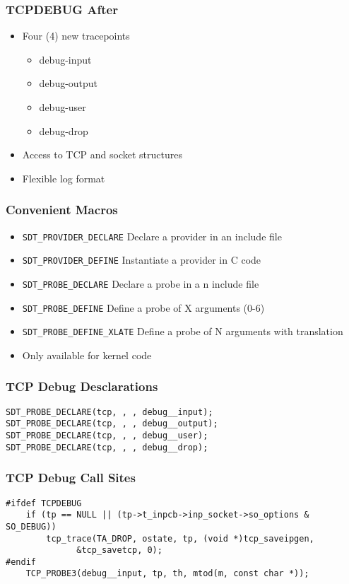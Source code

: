 \documentclass[pdftex]{beamer}
\begin{document}
\begin{frame}
  \frametitle{TCPDEBUG After}
  \begin{itemize}
  \item Four (4) new tracepoints
    \begin{itemize}
    \item debug-input
    \item debug-output
    \item debug-user
    \item debug-drop
    \end{itemize}
  \item Access to TCP and socket structures
  \item Flexible log format
  \end{itemize}
\end{frame}

\begin{frame}[fragile]
  \frametitle{Convenient Macros}
  \begin{itemize}
  \item \verb|SDT_PROVIDER_DECLARE| Declare a provider in an include file
  \item \verb|SDT_PROVIDER_DEFINE| Instantiate a provider in C code
  \item \verb|SDT_PROBE_DECLARE| Declare a probe in a n include file
  \item \verb|SDT_PROBE_DEFINE| Define a probe of X arguments (0-6)
  \item \verb|SDT_PROBE_DEFINE_XLATE| Define a probe of N arguments with translation
  \item Only available for kernel code
  \end{itemize}
\end{frame}

\begin{frame}[fragile]
  \frametitle{TCP Debug Desclarations}
\begin{lstlisting}
SDT_PROBE_DECLARE(tcp, , , debug__input);
SDT_PROBE_DECLARE(tcp, , , debug__output);
SDT_PROBE_DECLARE(tcp, , , debug__user);
SDT_PROBE_DECLARE(tcp, , , debug__drop);
\end{lstlisting}
\end{frame}

\begin{frame}[fragile]
  \frametitle{TCP Debug Call Sites}
\begin{lstlisting}
#ifdef TCPDEBUG
	if (tp == NULL || (tp->t_inpcb->inp_socket->so_options & SO_DEBUG))
		tcp_trace(TA_DROP, ostate, tp, (void *)tcp_saveipgen,
			  &tcp_savetcp, 0);
#endif
	TCP_PROBE3(debug__input, tp, th, mtod(m, const char *));
\end{lstlisting}
\end{frame}
\end{document}
